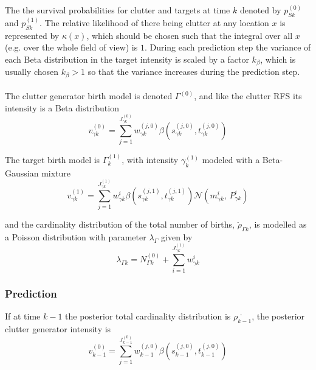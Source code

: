 \documentclass{article}
\newcommand{\clut}{{(0)}}
\newcommand{\tgt}{{(1)}}
\begin{document}
The the survival probabilities for clutter and targets at time $k$ denoted by $p_{Sk}^{(0)}$ and $p_{Sk}^{(1)}$. The relative likelihood of there being clutter at any location $x$ is represented by $\kappa(x)$, which should be chosen such that the integral over all $x$ (e.g. over the whole field of view) is $1$. During each prediction step the variance of each Beta distribution in the target intensity is scaled by a factor $k_{\beta}$, which is usually chosen $k_{\beta} > 1$ so that the variance increases during the prediction step.\\
\\
The clutter generator birth model is denoted $\Gamma^{(0)}$, and like the clutter RFS its intensity is a Beta distribution
\begin{equation}
  \label{eq:lpd_clutter_birth}
  v_{\gamma k}^\clut = \sum_{j=1}^{J^\clut _{\gamma k}}w_{\gamma k}^{(j, 0)}\beta(s_{\gamma k}^{(j, 0)}, t_{\gamma k}^{(j, 0)})
\end{equation}

The target birth model is $\Gamma^{(1)}_k$, with intensity $\gamma^{(1)}_k$ modeled with a Beta-Gaussian mixture
\begin{equation}
  \label{eq:lpd_tgt_birth}
    v_{\gamma k}^\tgt = \sum_{j=1}^{J^\tgt _{\gamma k}}w_{\gamma k}^i \beta(s_{\gamma k}^{(j, 1)}, t_{\gamma k}^{(j, 1)})\mathcal{N}(m_{\gamma k}^i,\,P_{\gamma k}^i)
\end{equation}

and the cardinality distribution of the total number of births, $\ddot{\rho}_{\Gamma k}$, is modelled as a Poisson distribution with parameter $\lambda_\Gamma$ given by
\begin{equation}
  \label{eq:lpd_rho_gamma}
\lambda_{\Gamma k} = N_{\Gamma k}^{(0)} + \sum_{i=1}^{J_{\gamma k}^{(1)}}w_{\gamma k}^i 
\end{equation}

\subsubsection*{Prediction}

If at time $k-1$ the posterior total cardinality distribution is $\ddot{\rho_{k-1}}$, the posterior clutter generator intensity is \cite{cphd}
\begin{equation}
  \label{eq:lpd_v0k-1}
  v_{k-1}^\clut = \sum_{j=1}^{J^\clut _{k-1}}w_{k-1}^{(j, 0)}\beta(s_{k-1}^{(j, 0)}, t_{k-1}^{(j, 0)})
\end{equation}
\end{document}

